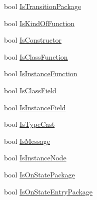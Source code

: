 \begin{DoxyCompactItemize}
bool \hyperlink{classi_c_s___engine_object_a10cbd0acc0b4f2c153a0d3c328d2d877}{Is\+Transition\+Package}
\item 
bool \hyperlink{classi_c_s___engine_object_a57fda1055fc2a77e436614d8035179fd}{Is\+Kind\+Of\+Function}
\item 
bool \hyperlink{classi_c_s___engine_object_a8551d5e4b321e0f99f2df2bb312f35d8}{Is\+Constructor}
\item 
bool \hyperlink{classi_c_s___engine_object_a751b4e24ebb0398292a928ce1f167751}{Is\+Class\+Function}
\item 
bool \hyperlink{classi_c_s___engine_object_abeefa6c463c87ee35ac3b960e04650b4}{Is\+Instance\+Function}
\item 
bool \hyperlink{classi_c_s___engine_object_a7792cf36acf1e277cc57b9e14a069f12}{Is\+Class\+Field}
\item 
bool \hyperlink{classi_c_s___engine_object_a828ad0b44ee7f8276731b20f7eed84e3}{Is\+Instance\+Field}
\item 
bool \hyperlink{classi_c_s___engine_object_a7f4a02001235ff67b03dfd753fdb2a4b}{Is\+Type\+Cast}
\item 
bool \hyperlink{classi_c_s___engine_object_ac90ec713bd97f8bcad2af90645feb103}{Is\+Message}
\item 
bool \hyperlink{classi_c_s___engine_object_a760a24107880933fbce14d189c732721}{Is\+Instance\+Node}
\item 
bool \hyperlink{classi_c_s___engine_object_afab1b9e5c5902cdfb74aa639441243d6}{Is\+On\+State\+Package}
\item 
bool \hyperlink{classi_c_s___engine_object_aed723301754e942948e46cab8ba0a4b7}{Is\+On\+State\+Entry\+Package}

\end{DoxyCompactItemize}
